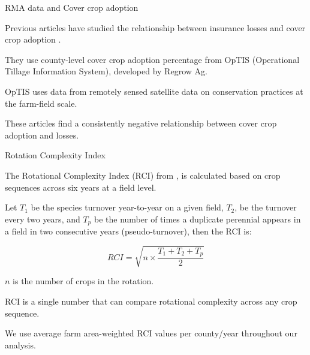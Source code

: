 \documentclass[notes,11pt, aspectratio=169]{beamer}
\newenvironment{wideitemize}{\itemize\addtolength{\itemsep}{10pt}}{\enditemize}
\begin{document}
\begin{frame}{RMA data and Cover crop adoption}
    \begin{wideitemize}
        \item Previous articles have studied the relationship between insurance losses and cover crop adoption \citep{aglasan2024, won2024}.
        \item They use county-level cover crop adoption percentage from OpTIS (Operational Tillage Information System), developed by Regrow Ag.
        \item OpTIS uses data from remotely sensed satellite data on conservation practices at the farm-field scale.
        \item These articles find a consistently negative relationship between cover crop adoption and losses.
    \end{wideitemize}
\end{frame} 


\begin{frame}{Rotation Complexity Index}
    \begin{wideitemize}
        \item The Rotational Complexity Index (RCI) from \cite{socolar2021}, is calculated based on crop sequences across six years at a field level.
        \item Let $T_{1}$ be the species turnover year-to-year on a given field, $T_{2}$, be the turnover every two years, and $T_{p}$ be the number of times a duplicate perennial appears in a field in two consecutive years (pseudo-turnover), then the RCI is:

        \begin{equation*}
            RCI = \sqrt{n\times\dfrac{T_{1}+T_{2}+T_{p}}{2}}
        \end{equation*}
        \item $n$ is the number of crops in the rotation. 
        \item RCI is a single number that can compare rotational complexity across any crop sequence.
        \item We use average farm area-weighted RCI values per county/year throughout our analysis.
    \end{wideitemize}
\end{frame}
\end{document}
